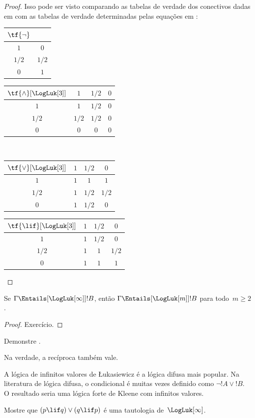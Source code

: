 \documentclass[../../../include/open-logic-section]{subfiles}
\begin{document}
\begin{proof}
  Isso pode ser visto comparando as tabelas de verdade dos conectivos
  dadas em  com as tabelas de verdade
  determinadas pelas equações em :
  \begin{center}
    \begin{tabular}{c|c} 
      $\tf{\lnot}$ & \\ 
      \hline  
      $1$ & $0$ \\ 
      $1/2$ & $1/2$ \\
      $0$ & $1$ 
    \end{tabular}
    \quad
    \begin{tabular}{c|ccc} 
      $\tf{\land}[\LogLuk[3]]$ & $1$ & $1/2$ & $0$ \\ 
      \hline 
      $1$ & $1$ & $1/2$ & $0$ \\ 
      $1/2$ & $1/2$ & $1/2$ & $0$\\ 
      $0$ & $0$ & $0$ & $0$ 
    \end{tabular}
    \\[2ex]
    \begin{tabular}{c|ccc} 
      $\tf{\lor}[\LogLuk[3]]$ & $1$ & $1/2$ & $0$ \\ 
      \hline 
      $1$ & $1$ & $1$ & $1$ \\ 
      $1/2$ & $1$ & $1/2$ & $1/2$ \\
      $0$ & $1$ & $1/2$ & $0$ 
    \end{tabular}
    \quad
    \begin{tabular}{c|ccc} 
      $\tf{\lif}[\LogLuk[3]]$ & $1$ & $1/2$ & $0$ \\ 
      \hline 
      $1$ & $1$ & $1/2$ & $0$ \\ 
      $1/2$ & $1$ & $1$ & $1/2$  \\ 
      $0$ & $1$ & $1$ & $1$ 
    \end{tabular}
  \end{center} 
\end{proof}

\begin{prop}
  Se $\Gamma \Entails[\LogLuk[\infty]] !B$, então $\Gamma
  \Entails[\LogLuk[m]] !B$ para todo~$m \ge 2$.
\end{prop}

\begin{proof}
  Exercício.
\end{proof}

\begin{prob}
  Demonstre .
\end{prob}

Na verdade, a recíproca também vale.

A lógica de infinitos valores de \L ukasiewicz é a lógica difusa mais
popular. Na literatura de lógica difusa, o condicional é muitas vezes
definido como $\lnot !A \lor !B$. O resultado seria uma lógica forte
de Kleene com infinitos valores.

\begin{prob}
  Mostre que $(p \lif q) \lor (q \lif p)$ é uma
  tautologia de~$\LogLuk[\infty]$.
\end{prob}
\end{document}
